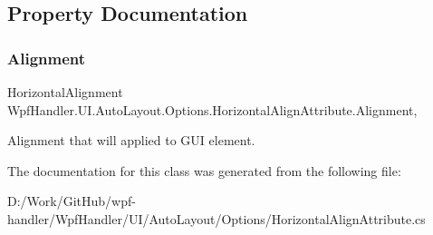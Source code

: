 \subsection{Property Documentation}
\mbox{\label{class_wpf_handler_1_1_u_i_1_1_auto_layout_1_1_options_1_1_horizontal_align_attribute_a7e62bc68b5e19d0f8167a97146996b6c}} 
\subsubsection{\texorpdfstring{Alignment}{Alignment}}
{\footnotesize\ttfamily Horizontal\+Alignment Wpf\+Handler.\+U\+I.\+Auto\+Layout.\+Options.\+Horizontal\+Align\+Attribute.\+Alignment\hspace{0.3cm}{\ttfamily [get]}, {\ttfamily [set]}}



Alignment that will applied to G\+UI element. 



The documentation for this class was generated from the following file\+:\begin{DoxyCompactItemize}
\item 
D\+:/\+Work/\+Git\+Hub/wpf-\/handler/\+Wpf\+Handler/\+U\+I/\+Auto\+Layout/\+Options/Horizontal\+Align\+Attribute.\+cs\end{DoxyCompactItemize}
